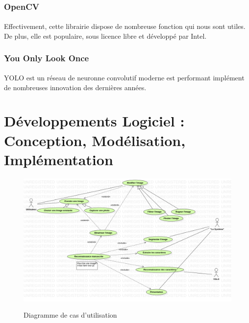 \documentclass[a4paper]{article}
\begin{document}
			\subsubsection*{OpenCV}
				\paragraph{} Effectivement, cette librairie dispose de nombreuse fonction qui nous sont utiles. De plus, elle est populaire, sous licence libre et développé par Intel.
			\subsubsection*{You Only Look Once}
				\paragraph{} YOLO est un réseau de neuronne convolutif moderne est performant implément de nombreuses innovation des dernières années.
	\newpage
	\section{Développements Logiciel : Conception, Modélisation, Implémentation}
		\begin{figure}[h]
			\caption{Diagramme de cas d'utilisation}
			\includegraphics[width=\textwidth]{UseCaseDiagram.png}
			\centering
			\label{fig:useCaseDiagram}
		\end{figure}
\end{document}
